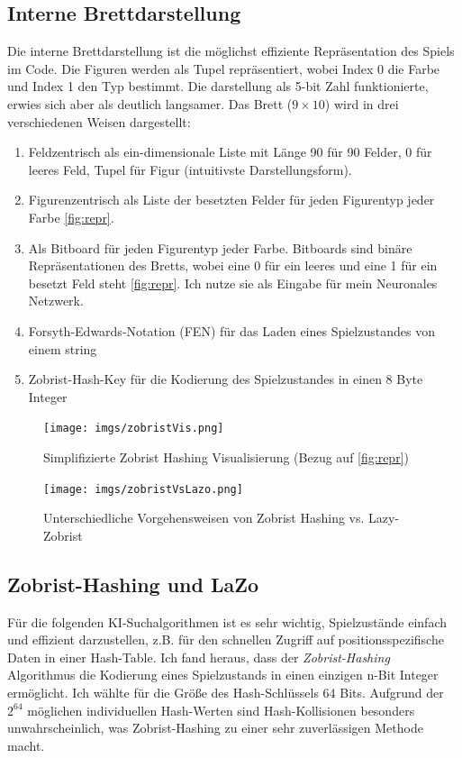 \documentclass{jpp}
\begin{document}
\subsection{Interne Brettdarstellung}\label{subsec:interneDarstellung}
Die interne Brettdarstellung ist die möglichst effiziente Repräsentation des Spiels im Code. Die Figuren werden als Tupel repräsentiert, wobei Index 0 die Farbe und Index 1 den Typ bestimmt. Die darstellung als 5-bit Zahl funktionierte, erwies sich aber als deutlich langsamer. Das Brett ($9\times10$) wird in drei verschiedenen Weisen dargestellt:

\begin{enumerate}
\item Feldzentrisch als ein-dimensionale Liste mit Länge 90 für 90 Felder, 0 für leeres Feld, Tupel für Figur (intuitivste Darstellungsform).
\item Figurenzentrisch als Liste der besetzten Felder für jeden Figurentyp jeder Farbe \ref{fig:repr}. 
\item Als Bitboard für jeden Figurentyp jeder Farbe. Bitboards sind binäre Repräsentationen des Bretts, wobei eine 0 für ein leeres und eine 1 für ein besetzt Feld steht \ref{fig:repr}. Ich nutze sie als Eingabe für mein Neuronales Netzwerk.
\item Forsyth-Edwards-Notation (FEN) für das Laden eines Spielzustandes von einem string
\item Zobrist-Hash-Key für die Kodierung des Spielzustandes in einen 8 Byte Integer
\end{enumerate}

\begin{figure}
    \centering
    \begin{minipage}{0.44\textwidth}
      \texttt{[image: imgs/zobristVis.png]}
      \caption{Simplifizierte Zobrist Hashing Visualisierung (Bezug auf \ref{fig:repr})}
      \label{fig:zobristHashing}
    \end{minipage}
    \hfill
    \begin{minipage}{0.55\textwidth}
      \texttt{[image: imgs/zobristVsLazo.png]}
      \caption{Unterschiedliche Vorgehensweisen von Zobrist Hashing vs. Lazy-Zobrist}
      \label{fig:zobristVis}
    \end{minipage}
  \end{figure}
  
\subsection{Zobrist-Hashing und LaZo}{\label{subsec:Zobrist}}
Für die folgenden KI-Suchalgorithmen ist es sehr wichtig, Spielzustände einfach und effizient darzustellen, z.B. für den schnellen Zugriff auf positionsspezifische Daten in einer Hash-Table. Ich fand heraus, dass der \textit{Zobrist-Hashing} Algorithmus die Kodierung eines Spielzustands in einen einzigen n-Bit Integer ermöglicht. Ich wählte für die Größe des Hash-Schlüssels 64 Bits.
Aufgrund der  $2^{64}$ möglichen individuellen Hash-Werten sind Hash-Kollisionen besonders unwahrscheinlich, was Zobrist-Hashing zu einer sehr zuverlässigen Methode macht.
\end{document}
